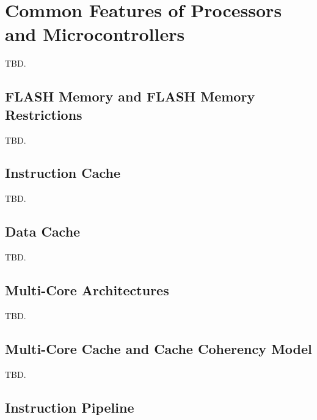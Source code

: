 \section{Common Features of Processors and Microcontrollers}
\label{scfp0}

TBD.


\subsection{FLASH Memory and FLASH Memory Restrictions}
\label{scfp0:sfmr0}

TBD.


\subsection{Instruction Cache}
\label{scfp0:sica0}

TBD.


\subsection{Data Cache}
\label{scfp0:sdca0}

TBD.


\subsection{Multi-Core Architectures}
\label{scfp0:smca0}

TBD.


\subsection{Multi-Core Cache and Cache Coherency Model}
\label{scfp0:smcc0}

TBD.


\subsection{Instruction Pipeline}
\label{scfp0:spip0}

